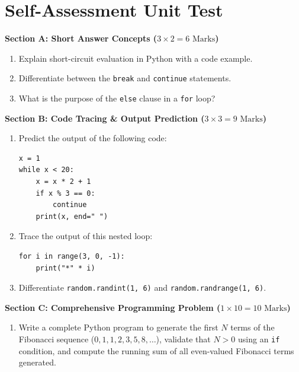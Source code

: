 \section{Self-Assessment Unit Test}

\begin{chaptertest}
\noindent\textbf{Section A: Short Answer Concepts ($3 \times 2 = 6\text{ Marks}$)}
\begin{enumerate}
    \item Explain short-circuit evaluation in Python with a code example.
    \item Differentiate between the \texttt{break} and \texttt{continue} statements.
    \item What is the purpose of the \texttt{else} clause in a \texttt{for} loop?
\end{enumerate}

\medskip
\noindent\textbf{Section B: Code Tracing \& Output Prediction ($3 \times 3 = 9\text{ Marks}$)}
\begin{enumerate}[start=4]
    \item Predict the output of the following code:
    \begin{lstlisting}[language=Python3]
x = 1
while x < 20:
    x = x * 2 + 1
    if x % 3 == 0:
        continue
    print(x, end=" ")
    \end{lstlisting}
    \item Trace the output of this nested loop:
    \begin{lstlisting}[language=Python3]
for i in range(3, 0, -1):
    print("*" * i)
    \end{lstlisting}
    \item Differentiate \texttt{random.randint(1, 6)} and \texttt{random.randrange(1, 6)}.
\end{enumerate}

\medskip
\noindent\textbf{Section C: Comprehensive Programming Problem ($1 \times 10 = 10\text{ Marks}$)}
\begin{enumerate}[start=7]
    \item Write a complete Python program to generate the first $N$ terms of the Fibonacci sequence ($0, 1, 1, 2, 3, 5, 8, \dots$), validate that $N > 0$ using an \texttt{if} condition, and compute the running sum of all even-valued Fibonacci terms generated.
\end{enumerate}
\end{chaptertest}

